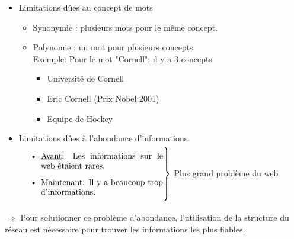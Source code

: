 \documentclass{article}
\begin{document}
\begin{itemize}
    \item Limitations dûes au concept de mots 
        \begin{itemize}
            \item Synonymie : plusieurs mots pour le même concept.
            \item Polynomie : un mot pour plusieurs concepts.\\
            \underline{Exemple}: Pour le mot "Cornell": il y a 3 concepts
                 \begin{itemize}
                    \item Université de Cornell
                    \item Eric Cornell (Prix Nobel 2001) 
                    \item Equipe de Hockey
                 \end{itemize}

        \end{itemize}
    \item Limitations dûes à l'abondance d'informations. \\
    $\left. \text{\parbox{0.5\linewidth}{
        \begin{itemize}
            \item \underline{Avant}: Les informations sur le web étaient rares. 
            \item \underline{Maintenant}: Il y a beaucoup trop d'informations.
        \end{itemize}
        }} \right \}$ Plus grand problème du web
\end{itemize}
    
$\Rightarrow$ Pour solutionner ce problème d'abondance, l'utilisation de la structure du réseau est nécessaire pour trouver les informations les plus fiables.
\end{document}
